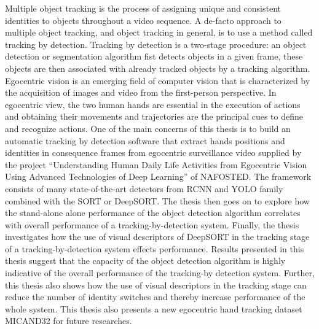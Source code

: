 % 
% 
%
Multiple object tracking is the process of assigning unique and consistent identities to objects throughout a video sequence. A de-facto approach to multiple object tracking, and object tracking in general, is to use a method called tracking by detection. Tracking by detection is a two-stage procedure: an object detection or segmentation algorithm fist detects objects in a given frame, these objects are then associated with already tracked objects by a tracking algorithm. Egocentric vision is an emerging field of computer vision that is characterized by the acquisition of images and video from the first-person perspective. In egocentric view, the two human hands are essential in the execution of actions and obtaining their movements and trajectories are the principal cues to define and recognize actions.
One of the main concerns of this thesis is to build an automatic tracking by detection software that extract hands positions and identities in consequence frames from egocentric surveillance video supplied by the project “Understanding Human Daily Life Activities from Egocentric Vision Using Advanced Technologies of Deep Learning” of NAFOSTED. The framework consists of many state-of-the-art detectors from RCNN and YOLO family combined with the SORT or DeepSORT. The thesis then goes on to explore how the stand-alone alone performance of the object detection algorithm correlates with overall performance of a tracking-by-detection system. Finally, the thesis investigates how the use of visual descriptors of DeepSORT in the tracking stage of a tracking-by-detection system effects performance.
Results presented in this thesis suggest that the capacity of the object detection algorithm is highly indicative of the overall performance of the tracking-by detection system. Further, this thesis also shows how the use of visual descriptors in the tracking stage can reduce the number of identity switches and thereby increase performance of the whole system. This thesis also presents a new egocentric hand tracking dataset MICAND32 for future researches.

